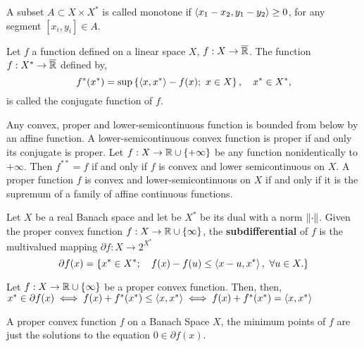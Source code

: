 A subset $A\subset X\times X^*$ is called monotone if $\left\langle x_1-x_2, y_1-y_2 \right\rangle\geq 0$, for any segment $[x_i, y_i]\in A$.
\begin{definition}
	Let $f$ a function defined on a linear space $X$, $f:X\to\overline{\mathbb{R}}$. The function $f:X^*\to\overline{\mathbb{R}}$ defined by,
	\begin{equation}
		f^*(x^*)=\sup\braces{\anglesbox{x,x^*}-f(x);\ x\in X}, \quad x^*\in X^*,
	\end{equation} is called the conjugate function of $f$. 
\end{definition}

Any convex, proper and lower-semicontinuous function is bounded from below by an affine function. A lower-semicontinuous convex function is proper if and only its conjugate is proper. Let $f: X\to\mathbb{R}\cup\left\lbrace +\infty \right\rbrace$ be any function nonidentically to $+\infty$. Then $f^{**}=f$ if and only if $f$ is convex and lower semicontinuous on $X$. A proper function $f$ is convex and lower-semicontinuous on $X$ if and only if it is the supremum of a family of affine continuous functions.

\begin{definition}[Subdifferential]
	Let $X$ be a real Banach space and let be $X^*$ be its dual with a norm $\left\|\cdot\right\|$. Given the proper convex function $f:X\rightarrow \mathbb{R}\cup\left\lbrace \infty \right\rbrace$, the \textbf{subdifferential} of $f$  is the multivalued mapping $\partial f:X\to2^{X^*}$
	\begin{equation*}
		\partial f(x)=\left\lbrace x^*\in X^*;\quad f(x)-f(u)\leq \left\langle x-u, x^* \right\rangle,\ \forall u \in X. \right\rbrace		
	\end{equation*}
\end{definition}

\begin{theorem}
	Let $f:X\to\mathbb{R}\cup\left\lbrace \infty \right\rbrace$ be a proper convex function. Then, then, $x^*\in\partial f(x)\iff f(x)+f^*(x^*)\leq\left\langle x, x^* \right\rangle\iff f(x)+f^*(x^*)=\left\langle x, x^* \right\rangle$
\end{theorem}
A proper convex function $f$ on a Banach Space $X$, the minimum points of $f$ are just the solutions to the equation  $0\in\partial f(x)$.




